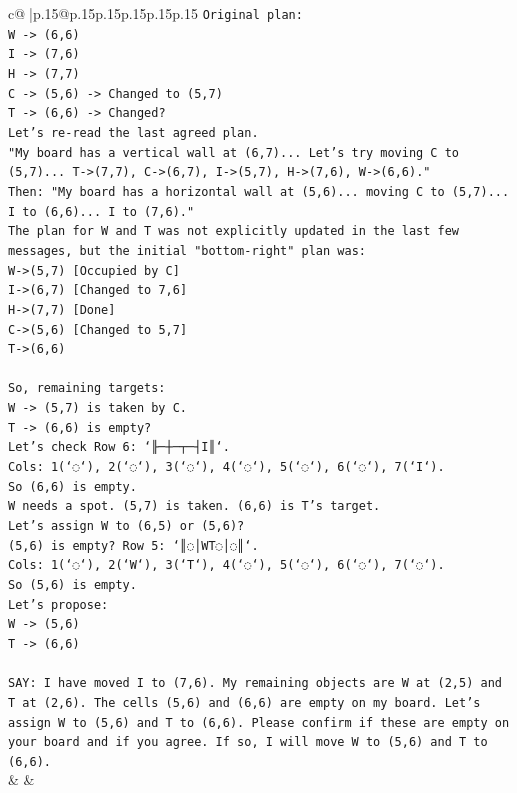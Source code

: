 \documentclass{article}
\begin{document}
{\begin{supertabular}{c@{$\;$}|p{.15\linewidth}@{}p{.15\linewidth}p{.15\linewidth}p{.15\linewidth}p{.15\linewidth}p{.15\linewidth}}
{{{\texttt{Original plan:} \\
\texttt{W {-}> (6,6)} \\
\texttt{I {-}> (7,6)} \\
\texttt{H {-}> (7,7)} \\
\texttt{C {-}> (5,6) {-}> Changed to (5,7)} \\
\texttt{T {-}> (6,6) {-}> Changed?} \\
\texttt{Let's re{-}read the last agreed plan.} \\
\texttt{"My board has a vertical wall at (6,7)... Let's try moving C to (5,7)... T{-}>(7,7), C{-}>(6,7), I{-}>(5,7), H{-}>(7,6), W{-}>(6,6)."} \\
\texttt{Then: "My board has a horizontal wall at (5,6)... moving C to (5,7)... I to (6,6)... I to (7,6)."} \\
\texttt{The plan for W and T was not explicitly updated in the last few messages, but the initial "bottom{-}right" plan was:} \\
\texttt{W{-}>(5,7) {[}Occupied by C{]}} \\
\texttt{I{-}>(6,7) {[}Changed to 7,6{]}} \\
\texttt{H{-}>(7,7) {[}Done{]}} \\
\texttt{C{-}>(5,6) {[}Changed to 5,7{]}} \\
\texttt{T{-}>(6,6)} \\
\\ 
\texttt{So, remaining targets:} \\
\texttt{W {-}> (5,7) is taken by C.} \\
\texttt{T {-}> (6,6) is empty?} \\
\texttt{Let's check Row 6: `╟─┼─┬─┤I║`.} \\
\texttt{Cols: 1(`◌`), 2(`◌`), 3(`◌`), 4(`◌`), 5(`◌`), 6(`◌`), 7(`I`).} \\
\texttt{So (6,6) is empty.} \\
\texttt{W needs a spot. (5,7) is taken. (6,6) is T's target.} \\
\texttt{Let's assign W to (6,5) or (5,6)?} \\
\texttt{(5,6) is empty? Row 5: `║◌│WT◌│◌║`.} \\
\texttt{Cols: 1(`◌`), 2(`W`), 3(`T`), 4(`◌`), 5(`◌`), 6(`◌`), 7(`◌`).} \\
\texttt{So (5,6) is empty.} \\
\texttt{Let's propose:} \\
\texttt{W {-}> (5,6)} \\
\texttt{T {-}> (6,6)} \\
\\ 
\texttt{SAY: I have moved I to (7,6). My remaining objects are W at (2,5) and T at (2,6). The cells (5,6) and (6,6) are empty on my board. Let's assign W to (5,6) and T to (6,6). Please confirm if these are empty on your board and if you agree. If so, I will move W to (5,6) and T to (6,6).} \\
            }
        }
    }
    & & \\ \\


\end{supertabular}}
\end{document}
